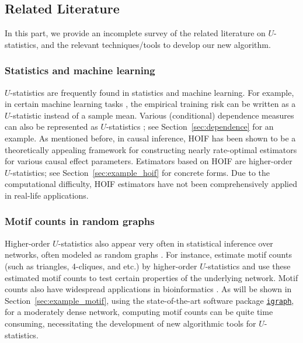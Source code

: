 \documentclass[letterpaper,11pt]{article}
\newcommand{\libref}[2]{\href{#2}{\texttt{#1}}}
\def\igraph{\libref{igraph}{https://igraph.org/}}
\begin{document}
\begin{bibunit}[plainnat]
\subsection*{Related Literature}

In this part, we provide an incomplete survey of the related literature on $U$-statistics, and the relevant techniques/tools to develop our new algorithm.

\subsubsection*{Statistics and machine learning}

$U$-statistics are frequently found in statistics and machine learning. For example, in certain machine learning tasks \citep{clemenccon2008ranking, clemenccon2013maximal, shen2025engression}, the empirical training risk can be written as a $U$-statistic instead of a sample mean. Various (conditional) dependence measures can also be represented as $U$-statistics \citep{yao2018testing, neykov2021minimax, chatterjee2021new, azadkia2021simple, shao2025u, zhang2025adaptive}; see Section~\ref{sec:dependence} for an example. As mentioned before, in causal inference, HOIF has been shown to be a theoretically appealing framework for constructing nearly rate-optimal estimators for various causal effect parameters. Estimators based on HOIF are higher-order $U$-statistics; see Section~\ref{sec:example_hoif} for concrete forms. Due to the computational difficulty, HOIF estimators have not been comprehensively applied in real-life applications. 


\subsubsection*{Motif counts in random graphs}

Higher-order $U$-statistics also appear very often in statistical inference over networks, often modeled as random graphs \citep{chatterjee2024higher, jin2025counting}. For instance, \citet{chatterjee2024higher} estimate motif counts (such as triangles, 4-cliques, and etc.) by higher-order $U$-statistics and use these estimated motif counts to test certain properties of the underlying network. Motif counts also have widespread applications in bioinformatics \citep{wernicke2006fanmod}. As will be shown in Section~\ref{sec:example_motif}, using the state-of-the-art software package \igraph{}, for a moderately dense network, computing motif counts can be quite time consuming, necessitating the development of new algorithmic tools for $U$-statistics. 


\end{bibunit}
\end{document}

